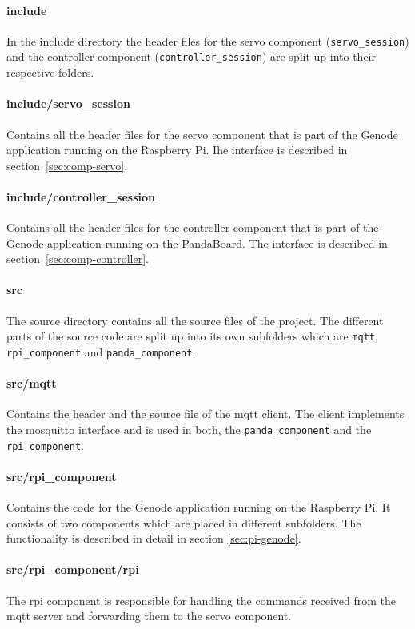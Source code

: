 \paragraph{include}
In the include directory the header files for the servo component (\texttt{servo\_session}) and the controller component (\texttt{controller\_session}) are split up into their respective folders.

\paragraph{include/servo\_session}
Contains all the header files for the servo component that is part of the Genode application running on the Raspberry Pi. Ihe interface is described in section~\ref{sec:comp-servo}.

\paragraph{include/controller\_session}
Contains all the header files for the controller component that is part of the Genode application running on the PandaBoard. The interface is described in section~\ref{sec:comp-controller}.

\paragraph{src}
The source directory contains all the source files of the project.
The different parts of the source code are split up into its own subfolders which are \texttt{mqtt}, \texttt{rpi\_component} and \texttt{panda\_component}.

\paragraph{src/mqtt}
Contains the header and the source file of the mqtt client. The client implements the mosquitto interface and is used in both, the \texttt{panda\_component} and the \texttt{rpi\_component}.

\paragraph{src/rpi\_component}
Contains the code for the Genode application running on the Raspberry Pi. It consists of two components which are placed in different subfolders. The functionality is described in detail in section \ref{sec:pi-genode}.

\paragraph{src/rpi\_component/rpi}
The rpi component is responsible for handling the commands received from the mqtt server and forwarding them to the servo component.

